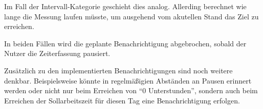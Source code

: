 Im Fall der Intervall-Kategorie geschieht dies analog.
Allerding berechnet wie lange die Messung laufen müsste,
um ausgehend vom akutellen Stand das Ziel zu erreichen.

In beiden Fällen wird die geplante Benachrichtigung abgebrochen,
sobald der Nutzer die Zeiterfassung pausiert.

Zusätzlich zu den implementierten Benachrichtigungen sind noch weitere denkbar.
Beispielsweise könnte in regelmäßigien Abständen an Pausen erinnert werden
oder nicht nur beim Erreichen von \enquote{0 Unterstunden},
sondern auch beim Erreichen der Sollarbeitszeit für diesen Tag eine Benachrichtigung erfolgen.


